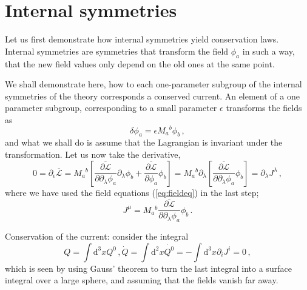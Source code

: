 \documentclass[a4paper,12pt]{article}
\def\d{\mathrm{d}}
\def\lag{{\mathcal{L}}}
\begin{document}
\section{Internal symmetries}\label{sec:int}
Let us first demonstrate how internal symmetries yield conservation laws. Internal symmetries are symmetries that transform the field $\phi_a$ in such a way, that the new field values only depend on the old ones at the same point. 

We shall demonstrate here, how to each one-parameter subgroup of the internal symmetries of the theory corresponds a conserved current. An element of a one parameter subgroup, corresponding to a small parameter $\epsilon$ transforms the fields as
\begin{equation}\label{eq:IntSP}
 \delta \phi_a = \epsilon M_a{}^b \phi_b\,,
\end{equation}
and what we shall do is assume that the Lagrangian is invariant under the transformation. Let us now take the derivative,
\begin{equation}\label{eq:DLIS}
 0=\partial_\epsilon \overline{\lag}=M_a{}^b\left[\overline{\frac{\partial{\lag}}{\partial\partial_\lambda\phi_a} }\partial_\lambda\phi_b + \overline{\frac{\partial\lag}{\partial\phi_a}}\phi_b\right] = M_a{}^b \partial_\lambda\left[\overline{\frac{\partial{\lag}}{\partial\partial_\lambda\phi_a}}\phi_b\right]=\partial_\lambda J^\lambda\,,
\end{equation}
where we have used the field equations (\ref{eq:fieldeq}) in the last step;
\begin{equation}\label{eq:JIS}
 J^\mu = M_a{}^b\overline{\frac{\partial{\lag}}{\partial\partial_\lambda\phi_a}}\phi_b\,.
\end{equation}

Conservation of the current: consider the integral
\begin{equation}\label{eq:Jcons}
 Q = \int \d^3 x Q^0\,, \dot{Q} = \int \d^2 x \dot{Q^0} = -\int\d^3 x \partial_i J^i = 0\,,
\end{equation}
which is seen by using Gauss' theorem to turn the last integral into a surface integral over a large sphere, and assuming that the fields vanish far away.
\end{document}
